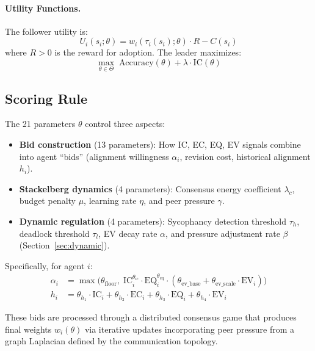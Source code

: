 \paragraph{Utility Functions.} The follower utility is:
\begin{equation}
    U_i(s_i; \theta) = w_i(\tau_i(s_i); \theta) \cdot R - C(s_i)
    \label{eq:follower_utility}
\end{equation}
where $R > 0$ is the reward for adoption. The leader maximizes:
\begin{equation}
    \max_{\theta \in \Theta} \; \text{Accuracy}(\theta) + \lambda \cdot \text{IC}(\theta)
    \label{eq:leader_obj}
\end{equation}

\subsection{Scoring Rule}
\label{sec:scoring}

The 21 parameters $\theta$ control three aspects:

\begin{itemize}
    \item \textbf{Bid construction} (13 parameters): How IC, EC, EQ, EV signals combine into agent ``bids'' (alignment willingness $\alpha_i$, revision cost, historical alignment $h_i$).
    \item \textbf{Stackelberg dynamics} (4 parameters): Consensus energy coefficient $\lambda_c$, budget penalty $\mu$, learning rate $\eta$, and peer pressure $\gamma$.
    \item \textbf{Dynamic regulation} (4 parameters): Sycophancy detection threshold $\tau_h$, deadlock threshold $\tau_l$, EV decay rate $\alpha$, and pressure adjustment rate $\beta$ (Section~\ref{sec:dynamic}).
\end{itemize}

Specifically, for agent $i$:
\begin{align}
    \alpha_i &= \max\!\big(\theta_{\text{floor}}, \; \text{IC}_i^{\theta_{\text{ic}}} \cdot \text{EQ}_i^{\theta_{\text{eq}}} \cdot (\theta_{\text{ev\_base}} + \theta_{\text{ev\_scale}} \cdot \text{EV}_i)\big) \\
    h_i &= \theta_{h_1} \cdot \text{IC}_i + \theta_{h_2} \cdot \text{EC}_i + \theta_{h_3} \cdot \text{EQ}_i + \theta_{h_4} \cdot \text{EV}_i
\end{align}

These bids are processed through a distributed consensus game that produces final weights $w_i(\theta)$ via iterative updates incorporating peer pressure from a graph Laplacian defined by the communication topology.


